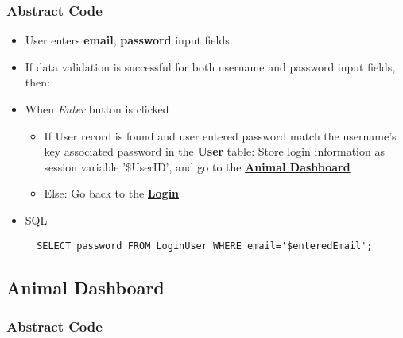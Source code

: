\documentclass[a4paper]{article}
\begin{document}
\subsubsection*{Abstract Code}

\begin{itemize}
        \item User enters \textbf{email}, \textbf{password} input fields.
        \item If data validation is successful for both username and password input fields, then:

\item When \textit{Enter} button is clicked \begin{itemize}
        \item If User record is found and user entered password match the username's key associated password in the \textbf{User} table: Store login information as session variable '\$UserID', and go to the \underline{\textbf{Animal Dashboard}}
	\item Else: Go back to the \underline{\textbf{Login}}
	\end{itemize}
  \item SQL
  \begin{verbatim}
  SELECT password FROM LoginUser WHERE email='$enteredEmail';
  \end{verbatim}

\end{itemize}

\hypertarget{animal_dashboard}{\subsection{Animal Dashboard}}

\subsubsection*{Abstract Code}
\end{document}
